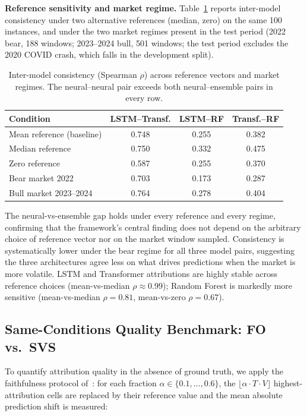 \documentclass[runningheads]{llncs}
\begin{document}
\textbf{Reference sensitivity and market regime.} Table~\ref{tab:robustness}
reports inter-model consistency under two alternative references
(median, zero) on the same 100 instances, and under the two market
regimes present in the test period (2022 bear, 188 windows;
2023--2024 bull, 501 windows; the test period excludes the 2020
COVID crash, which falls in the development split).

\begin{table}[ht]
\caption{Inter-model consistency (Spearman $\rho$) across reference
vectors and market regimes. The neural--neural pair exceeds both
neural--ensemble pairs in every row.}
\label{tab:robustness}
\centering
\begin{tabular}{lccc}
\toprule
\textbf{Condition} & \textbf{LSTM--Transf.} & \textbf{LSTM--RF} & \textbf{Transf.--RF} \\
\midrule
Mean reference (baseline)   & 0.748 & 0.255 & 0.382 \\
Median reference            & 0.750 & 0.332 & 0.475 \\
Zero reference               & 0.587 & 0.255 & 0.370 \\
\midrule
Bear market 2022             & 0.703 & 0.173 & 0.287 \\
Bull market 2023--2024       & 0.764 & 0.278 & 0.404 \\
\bottomrule
\end{tabular}
\end{table}

The neural-vs-ensemble gap holds under every reference and every
regime, confirming that the framework's central finding does not
depend on the arbitrary choice of reference vector nor on the market
window sampled. Consistency is systematically lower under the bear
regime for all three model pairs, suggesting the three architectures
agree less on what drives predictions when the market is more
volatile. LSTM and Transformer attributions are highly stable across
reference choices (mean-vs-median $\rho{\approx}0.99$); Random
Forest is markedly more sensitive (mean-vs-median $\rho{=}0.81$,
mean-vs-zero $\rho{=}0.67$).

\subsection{Same-Conditions Quality Benchmark: FO vs.\ SVS}
\label{sec:results_faithfulness}

To quantify attribution quality in the absence of ground truth, we
apply the faithfulness protocol of~\cite{crabbe2021}: for each
fraction $\alpha{\in}\{0.1,\ldots,0.6\}$, the
$\lfloor\alpha{\cdot}T{\cdot}V\rfloor$ highest-attribution cells are
replaced by their reference value and the mean absolute prediction
shift is measured:
\end{document}
